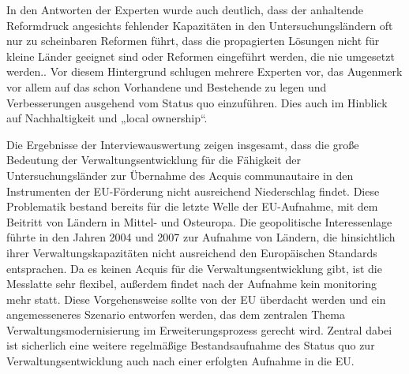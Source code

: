 In den Antworten der Experten wurde auch deutlich, dass der anhaltende Reformdruck angesichts fehlender Kapazitäten in den Untersuchungsländern oft nur zu scheinbaren Reformen führt, dass die propagierten Lösungen nicht für kleine Länder geeignet sind oder Reformen eingeführt werden, die nie umgesetzt werden.. Vor diesem Hintergrund schlugen mehrere Experten vor, das Augenmerk vor allem auf das schon Vorhandene und Bestehende zu legen und Verbesserungen ausgehend vom Status quo einzuführen. Dies auch im Hinblick auf Nachhaltigkeit und „local ownership“.\par
Die Ergebnisse der Interviewauswertung zeigen insgesamt, dass die große Bedeutung der Verwaltungsentwicklung für die Fähigkeit der Untersuchungsländer zur Übernahme des Acquis communautaire in den Instrumenten der EU-Förderung nicht ausreichend Niederschlag findet. Diese Problematik bestand bereits für die letzte Welle der EU-Aufnahme, mit dem Beitritt von Ländern in Mittel- und Osteuropa. Die geopolitische Interessenlage führte in den Jahren 2004 und 2007 zur Aufnahme von Ländern, die hinsichtlich ihrer Verwaltungskapazitäten nicht ausreichend den Europäischen Standards entsprachen. Da es keinen Acquis für die Verwaltungsentwicklung gibt, ist die Messlatte sehr flexibel, außerdem findet nach der Aufnahme kein monitoring mehr statt. Diese Vorgehensweise sollte von der EU überdacht werden und ein angemesseneres Szenario entworfen werden, das dem zentralen Thema Verwaltungsmodernisierung im Erweiterungsprozess gerecht wird. Zentral dabei ist sicherlich eine weitere regelmäßige Bestandsaufnahme des Status quo zur Verwaltungsentwicklung auch nach einer erfolgten Aufnahme in die EU.
